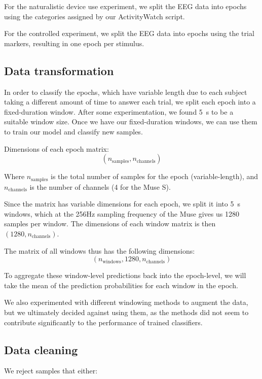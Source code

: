         For the naturalistic device use experiment, we split the EEG data into epochs using the categories assigned by our ActivityWatch script.

        For the controlled experiment, we split the EEG data into epochs using the trial markers, resulting in one epoch per stimulus.

    \subsection{Data transformation}\label{section:transform}

        In order to classify the epochs, which have variable length due to each subject taking a different amount of time to answer each trial, we split each epoch into a fixed-duration window. After some experimentation, we found \SI{5}{\second} to be a suitable window size. Once we have our fixed-duration windows, we can use them to train our model and classify new samples.

        Dimensions of each epoch matrix: \[ (n_{\mathrm{samples}}, n_{\mathrm{channels}}) \]

        Where $n_{\mathrm{samples}}$ is the total number of samples for the epoch (variable-length), and $n_{\mathrm{channels}}$ is the number of channels (4 for the Muse S).

        Since the matrix has variable dimensions for each epoch, we split it into \SI{5}{\second} windows, which at the 256Hz sampling frequency of the Muse gives us 1280 samples per window. The dimensions of each window matrix is then $(1280, n_{\mathrm{channels}})$.

        The matrix of all windows thus has the following dimensions: \[ (n_{\mathrm{windows}}, 1280, n_{\mathrm{channels}}) \]

        To aggregate these window-level predictions back into the epoch-level, we will take the mean of the prediction probabilities for each window in the epoch.

        We also experimented with different windowing methods to augment the data, but we ultimately decided against using them, as the methods did not seem to contribute significantly to the performance of trained classifiers.

    \subsection{Data cleaning}

        We reject samples that either:

